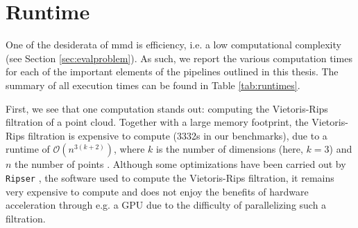 

\clearpage
\section{Runtime}\label{sec:results_runtime}

One of the desiderata of \acrshort{mmd} is efficiency, i.e. a low computational
complexity (see Section \ref{sec:evalproblem}). As such, we report the various
computation times for each of the important elements of the pipelines outlined
in this thesis. The summary of all execution times can be found in Table
\ref{tab:runtimes}.

First, we see that one computation stands out: computing the Vietoris-Rips
filtration of a point cloud. Together with a large memory footprint, the
Vietoris-Rips filtration is expensive to compute (3332s in our benchmarks), due
to a runtime of $\mathcal{O}(n^{3(k+2)})$, where $k$ is the number of dimensions
(here, $k=3$) and $n$ the number of points \citep{adams2018persistent}. Although
some optimizations have been carried out by \texttt{Ripser}
\cite{Bauer2021Ripser}, the software used to compute the Vietoris-Rips
filtration, it remains very expensive to compute and does not enjoy the benefits
of hardware acceleration through e.g. a GPU due to the difficulty of
parallelizing such a filtration.

